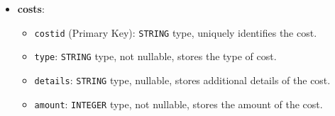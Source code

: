 \begin{itemize}
    \item \textbf{costs}:
    \begin{itemize}
        \item \texttt{costid} (Primary Key): \texttt{STRING} type, uniquely identifies the cost.
        \item \texttt{type}: \texttt{STRING} type, not nullable, stores the type of cost.
        \item \texttt{details}: \texttt{STRING} type, nullable, stores additional details of the cost.
        \item \texttt{amount}: \texttt{INTEGER} type, not nullable, stores the amount of the cost.
    \end{itemize}
\end{itemize}
